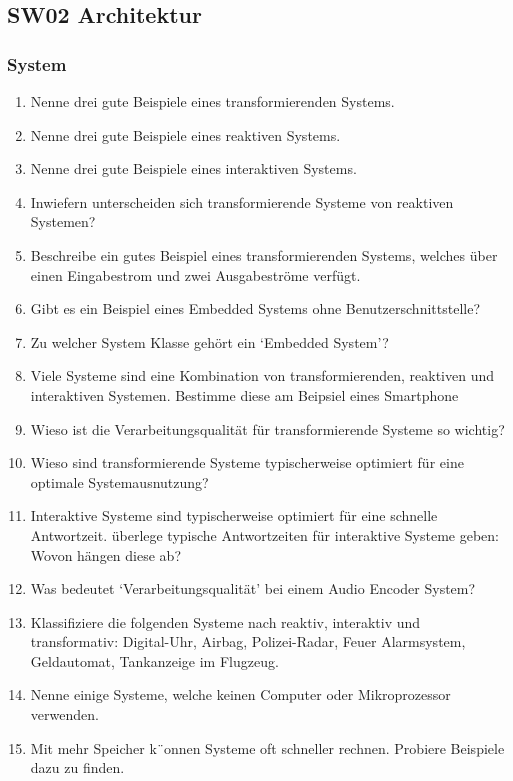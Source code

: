 \documentclass[
  10pt,
  a4paper,
]{article}
\numberwithin{equation}{section}
\begin{document}
\hypertarget{sw02-architektur}{%
\subsection{SW02 Architektur}\label{sw02-architektur}}

\hypertarget{system}{%
\subsubsection{System}\label{system}}

\begin{enumerate}
\def\labelenumi{\arabic{enumi}.}
\item
  Nenne drei gute Beispiele eines transformierenden Systems.
\item
  Nenne drei gute Beispiele eines reaktiven Systems.
\item
  Nenne drei gute Beispiele eines interaktiven Systems.
\item
  Inwiefern unterscheiden sich transformierende Systeme von reaktiven
  Systemen?
\item
  Beschreibe ein gutes Beispiel eines transformierenden Systems, welches
  über einen Eingabestrom und zwei Ausgabeströme verfügt.
\item
  Gibt es ein Beispiel eines Embedded Systems ohne
  Benutzerschnittstelle?
\item
  Zu welcher System Klasse gehört ein `Embedded System'?
\item
  Viele Systeme sind eine Kombination von transformierenden, reaktiven
  und interaktiven Systemen. Bestimme diese am Beipsiel eines Smartphone
\item
  Wieso ist die Verarbeitungsqualität für transformierende Systeme so
  wichtig?
\item
  Wieso sind transformierende Systeme typischerweise optimiert für eine
  optimale Systemausnutzung?
\item
  Interaktive Systeme sind typischerweise optimiert für eine schnelle
  Antwortzeit. überlege typische Antwortzeiten für interaktive Systeme
  geben: Wovon hängen diese ab?
\item
  Was bedeutet `Verarbeitungsqualität' bei einem Audio Encoder System?
\item
  Klassifiziere die folgenden Systeme nach reaktiv, interaktiv und
  transformativ: Digital-Uhr, Airbag, Polizei-Radar, Feuer Alarmsystem,
  Geldautomat, Tankanzeige im Flugzeug.
\item
  Nenne einige Systeme, welche keinen Computer oder Mikroprozessor
  verwenden.
\item
  Mit mehr Speicher k¨onnen Systeme oft schneller rechnen. Probiere
  Beispiele dazu zu finden.
\end{enumerate}
\end{document}
